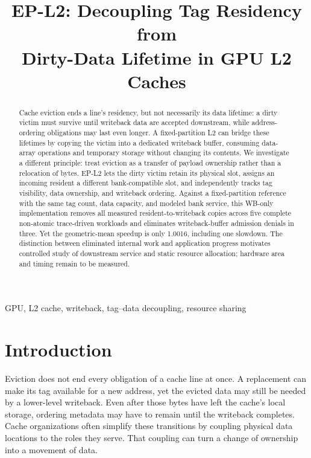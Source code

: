 \documentclass[conference,letterpaper]{IEEEtran}
\begin{document}
\title{EP-L2: Decoupling Tag Residency from\\Dirty-Data Lifetime in GPU L2 Caches}
\author{}
\maketitle
\begin{abstract}
Cache eviction ends a line's residency, but not necessarily its data lifetime: a dirty victim must survive until writeback data are accepted downstream, while address-ordering obligations may last even longer. A fixed-partition L2 can bridge these lifetimes by copying the victim into a dedicated writeback buffer, consuming data-array operations and temporary storage without changing its contents. We investigate a different principle: treat eviction as a transfer of payload ownership rather than a relocation of bytes. EP-L2 lets the dirty victim retain its physical slot, assigns an incoming resident a different bank-compatible slot, and independently tracks tag visibility, data ownership, and writeback ordering. Against a fixed-partition reference with the same tag count, data capacity, and modeled bank service, this WB-only implementation removes all measured resident-to-writeback copies across five complete non-atomic trace-driven workloads and eliminates writeback-buffer admission denials in three. Yet the geometric-mean speedup is only 1.0016, including one slowdown. The distinction between eliminated internal work and application progress motivates controlled study of downstream service and static resource allocation; hardware area and timing remain to be measured.
\end{abstract}

\begin{IEEEkeywords}
GPU, L2 cache, writeback, tag--data decoupling, resource sharing
\end{IEEEkeywords}

\section{Introduction}
Eviction does not end every obligation of a cache line at once. A replacement can make its tag available for a new address, yet the evicted data may still be needed by a lower-level writeback. Even after those bytes have left the cache's local storage, ordering metadata may have to remain until the writeback completes. Cache organizations often simplify these transitions by coupling physical data locations to the roles they serve. That coupling can turn a change of ownership into a movement of data.
\end{document}

